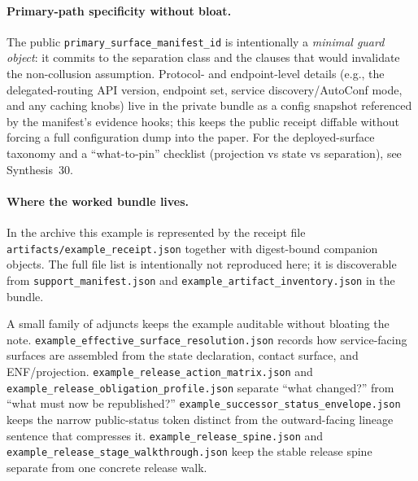 \documentclass[11pt]{article}
\begin{document}
\paragraph{Primary-path specificity without bloat.}
The public \texttt{primary\_surface\_manifest\_id} is intentionally a \emph{minimal guard object}: it commits to the separation class and the clauses that would invalidate the non-collusion assumption.\cite{series:primarysepmanifest}
Protocol- and endpoint-level details (e.g., the delegated-routing API version, endpoint set, service discovery/AutoConf mode, and any caching knobs) live in the private bundle as a config snapshot referenced by the manifest's evidence hooks; this keeps the public receipt diffable without forcing a full configuration dump into the paper.
For the deployed-surface taxonomy and a ``what-to-pin'' checklist (projection vs state vs separation), see Synthesis~30.\cite{series:deployedsurfaces}

\paragraph{Where the worked bundle lives.}
In the archive this example is represented by the receipt file \texttt{artifacts/example\_receipt.json} together with digest-bound companion objects.
The full file list is intentionally not reproduced here; it is discoverable from \texttt{support\_manifest.json} and \texttt{example\_artifact\_inventory.json} in the bundle.

A small family of adjuncts keeps the example auditable without bloating the note.
\texttt{example\_effective\_surface\_resolution.json} records how service-facing surfaces are assembled from the state declaration, contact surface, and ENF/projection.
\texttt{example\_release\_action\_matrix.json} and \texttt{example\_release\_obligation\_profile.json} separate ``what changed?'' from ``what must now be republished?''
\texttt{example\_successor\_status\_envelope.json} keeps the narrow public-status token distinct from the outward-facing lineage sentence that compresses it.
\texttt{example\_release\_spine.json} and \texttt{example\_release\_stage\_walkthrough.json} keep the stable release spine separate from one concrete release walk.
\end{document}
